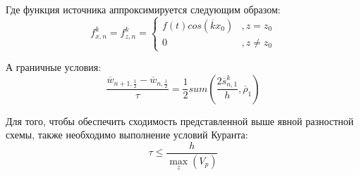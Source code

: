 Где функция источника аппроксимируется следующим образом:
$$
f_{x,n}^{ k}=f_{z,n}^{ k}=\left\{
  \begin{array}{ccc}
    f(t)cos(\overline k x_0) & , z=z_0 \\
    0 & , z\neq z_0
  \end{array}
\right.
$$

А граничные условия:
$$
\frac{\overline w_{n+1, \frac{1}{2}} - \overline w_{n, \frac{1}{2}}}{\tau}
= \frac{1}{2} sum(\frac{2\overline s_{n,1}^{ k}}{h}, \overline\rho_1)
$$

Для того, чтобы обеспечить сходимость представленной выше явной разностной схемы, также необходимо выполнение условий Куранта:
\begin{equation}
\label{eq:10}
\tau \leq \frac{h}{\max\limits_z\left({V_p}\right)}
\end{equation}

\clearpage
